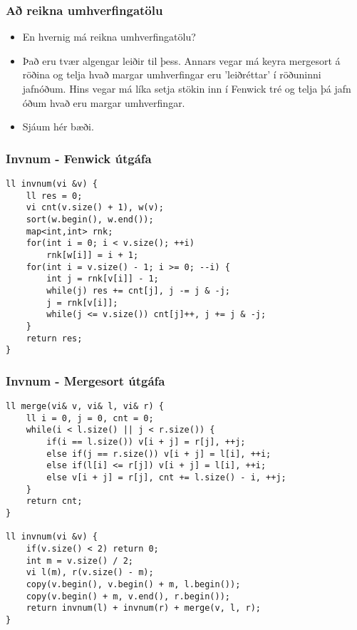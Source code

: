 \documentclass{beamer}
\begin{document}
\begin{frame}
\frametitle{Að reikna umhverfingatölu}

\begin{itemize}

\item<1-> En hvernig má reikna umhverfingatölu?

\item<2-> Það eru tvær algengar leiðir til þess. Annars vegar má keyra mergesort á röðina og telja hvað margar umhverfingar eru 'leiðréttar' í röðuninni jafnóðum. Hins vegar má líka setja stökin inn í Fenwick tré og telja þá jafn óðum hvað eru margar umhverfingar.

\item<3-> Sjáum hér bæði.

\end{itemize}

\end{frame}

\begin{frame}[fragile]
\frametitle{Invnum - Fenwick útgáfa}

\begin{verbatim}
ll invnum(vi &v) {
    ll res = 0; 
    vi cnt(v.size() + 1), w(v); 
    sort(w.begin(), w.end());
    map<int,int> rnk;
    for(int i = 0; i < v.size(); ++i)
        rnk[w[i]] = i + 1;
    for(int i = v.size() - 1; i >= 0; --i) {
        int j = rnk[v[i]] - 1;
        while(j) res += cnt[j], j -= j & -j;
        j = rnk[v[i]];
        while(j <= v.size()) cnt[j]++, j += j & -j;
    } 
    return res;
}
\end{verbatim}

\end{frame}

\begin{frame}[fragile]
\frametitle{Invnum - Mergesort útgáfa}

\begin{small}
\begin{verbatim}
ll merge(vi& v, vi& l, vi& r) {
    ll i = 0, j = 0, cnt = 0;
    while(i < l.size() || j < r.size()) {
        if(i == l.size()) v[i + j] = r[j], ++j;
        else if(j == r.size()) v[i + j] = l[i], ++i;
        else if(l[i] <= r[j]) v[i + j] = l[i], ++i;
        else v[i + j] = r[j], cnt += l.size() - i, ++j;
    } 
    return cnt; 
}

ll invnum(vi &v) { 
    if(v.size() < 2) return 0;
    int m = v.size() / 2; 
    vi l(m), r(v.size() - m);
    copy(v.begin(), v.begin() + m, l.begin());
    copy(v.begin() + m, v.end(), r.begin());
    return invnum(l) + invnum(r) + merge(v, l, r); 
}
\end{verbatim}
\end{small}

\end{frame}
\end{document}
